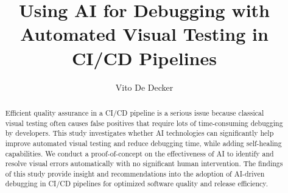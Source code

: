 \documentclass[english]{hogent-article}
\title{Using AI for Debugging with Automated Visual Testing in CI/CD Pipelines}
\author{Vito De Decker}
\begin{document}
\begin{abstract}
  Efficient quality assurance in a CI/CD pipeline is a serious issue because classical visual testing often causes false positives that require lots of time-consuming debugging by developers. This study investigates whether AI technologies can significantly help improve automated visual testing and reduce debugging time, while adding self-healing capabilities. We conduct a proof-of-concept on the effectiveness of AI to identify and resolve visual errors automatically with no significant human intervention. The findings of this study provide insight and recommendations into the adoption of AI-driven debugging in CI/CD pipelines for optimized software quality and release efficiency.
\end{abstract}

\tableofcontents



\end{document}
